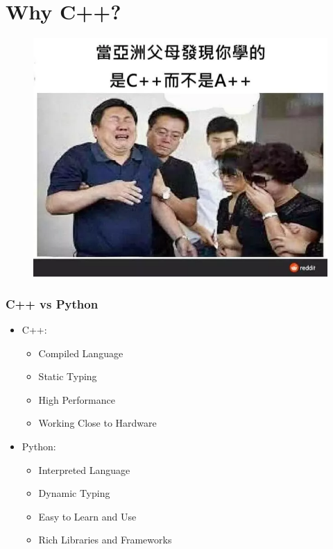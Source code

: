 \documentclass[xcolor=dvipsnames]{beamer}
\begin{document}
    \section{Why C++?}
    
    \begin{frame}
        \begin{figure}
            \centering
            \includegraphics[width=1\textwidth]{src/why_not_App.png}
        \end{figure}
    \end{frame}

    \begin{frame}
        \frametitle{C++ vs Python}
        \begin{itemize}
            \item C++:
            \begin{itemize}
                \item Compiled Language
                \item Static Typing
                \item High Performance
                \item Working Close to Hardware
            \end{itemize}
            \item Python:
            \begin{itemize}
                \item Interpreted Language
                \item Dynamic Typing
                \item Easy to Learn and Use
                \item Rich Libraries and Frameworks
            \end{itemize}
        \end{itemize}
    \end{frame}
\end{document}
